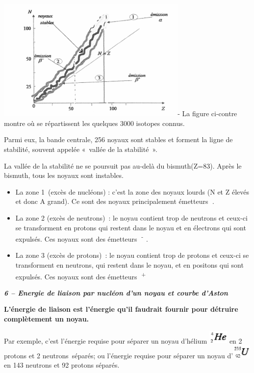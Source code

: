 \includegraphics[width=9.37cm,height=6.091cm]{Pictures/1000000100000162000000E5D8F5C376397D35D9.png}-
La figure ci-contre montre où se répartissent les quelques 3000 isotopes
connus.

Parmi eux, la bande centrale, 256 noyaux sont stables et forment la
ligne de stabilité, souvent appelée «~vallée de la stabilité~».

La vallée de la stabilité ne se poursuit pas au-delà du bismuth(Z=83).
Après le bismuth, tous les noyaux sont instables.

\begin{itemize}
\tightlist
\item
  La zone 1~(excès de nucléons) : c'est la zone des noyaux lourds (N et
  Z élevés et donc A grand). Ce sont des noyaux principalement émetteurs
  .
\item
  La zone 2 (excès de neutrons)~: le noyau contient trop de neutrons et
  ceux-ci se transforment en protons qui restent dans le noyau et en
  électrons qui sont expulsés. Ces noyaux sont des émetteurs
  \textsuperscript{-~}.
\item
  La zone 3 (excès de protons)~: le noyau contient trop de protons et
  ceux-ci se transforment en neutrons, qui restent dans le noyau, et en
  positons qui sont expulsés. Ces noyaux sont des émetteurs
  \textsuperscript{+}
\end{itemize}

\emph{\textbf{6 -- Energie de liaison par nucléon d'un noyau et courbe
d'Aston}}

\textbf{L'énergie de liaison est l'énergie qu'il faudrait fournir pour
détruire complètement un noyau. }

Par exemple, c'est l'énergie requise pour séparer un noyau d'hélium
\includegraphics[width=0.966cm,height=0.683cm]{Pictures/100000010000001B00000013CE6DE589828DD379.png}
en 2 protons et 2 neutrons~séparés; ou l'énergie requise pour séparer un
noyau
d'\includegraphics[width=0.918cm,height=0.683cm]{Pictures/100000010000001A000000131DF4E77671AB3F6E.png}
en 143 neutrons et 92 protons séparés.

